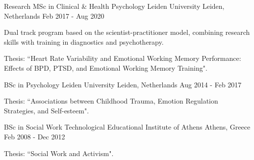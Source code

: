 

\begin{cventries}

  \cventry
    {Research MSc in Clinical \& Health Psychology} %
    {Leiden University} %
    {Leiden, Netherlands} %
    {Feb 2017 - Aug 2020} %
    {
      \begin{cvitems} %
        \item {
	        Dual track program based on the scientist-practitioner
	        model, combining research skills with
	        training in diagnostics and psychotherapy.
    	}
	    \item {
	    	Thesis: ``Heart Rate Variability and Emotional Working Memory Performance: Effects of BPD, PTSD, and Emotional Working Memory Training". 
		}
     \end{cvitems}
    }

\cventry
{BSc in Psychology} %
{Leiden University} %
{Leiden, Netherlands} %
{Aug 2014 - Feb 2017} %
{
	  \begin{cvitems} %
	   \item {
	   	Thesis: ``Associations between Childhood Trauma, Emotion
	   	Regulation Strategies, and Self-esteem".
	   }
	 \end{cvitems}
}

\cventry
{BSc in Social Work} %
{Technological Educational Institute of Athens} %
{Athens, Greece} %
{Feb 2008 - Dec 2012} %
{
	  \begin{cvitems} %
	    \item {Thesis: ``Social Work and Activism".}
	 \end{cvitems}
}
\end{cventries}
